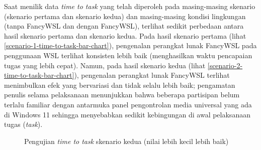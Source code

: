 Saat menilik data \textit{time to task} yang telah diperoleh pada masing-masing skenario (skenario pertama dan skenario kedua) dan masing-masing kondisi lingkungan (tanpa FancyWSL dan dengan FancyWSL), terlihat sedikit perbedaan antara hasil skenario pertama dan skenario kedua. Pada hasil skenario pertama (lihat \autoref{scenario-1-time-to-task-bar-chart}), pengenalan perangkat lunak FancyWSL pada penggunaan WSL terlihat konsisten lebih baik (menghasilkan waktu pencapaian tugas yang lebih cepat). Namun, pada hasil skenario kedua (lihat \autoref{scenario-2-time-to-task-bar-chart}), pengenalan perangkat lunak FancyWSL terlihat menimbulkan efek yang bervariasi dan tidak selalu lebih baik; pengamatan penulis selama pelaksanaan menunjukkan bahwa beberapa partisipan belum terlalu familiar dengan antarmuka panel pengontrolan media universal yang ada di Windows 11 sehingga menyebabkan sedikit kebingungan di awal pelaksanaan tugas (\textit{task}).

\begin{figure}
    \centering
    \caption{Pengujian \textit{time to task} skenario kedua (nilai lebih kecil lebih baik)}
    \label{scenario-1-time-to-task-bar-chart}
\end{figure}

